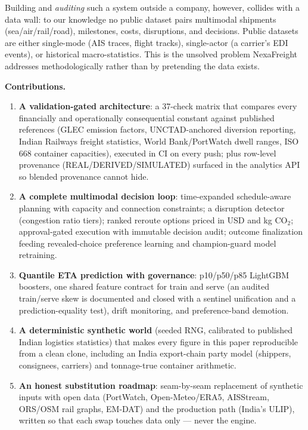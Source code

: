 \documentclass[11pt]{article}
\begin{document}
Building and \emph{auditing} such a system outside a company, however,
collides with a data wall: to our knowledge no public dataset pairs
multimodal shipments (sea/air/rail/road), milestones, costs, disruptions,
and decisions. Public datasets are either single-mode (AIS traces, flight
tracks), single-actor (a carrier's EDI events), or historical
macro-statistics. This is the unsolved problem NexaFreight addresses
methodologically rather than by pretending the data exists.

\textbf{Contributions.}
\begin{enumerate}
\item \textbf{A validation-gated architecture}: a 37-check matrix that
compares every financially and operationally consequential constant
against published references (GLEC emission factors, UNCTAD-anchored
diversion reporting, Indian Railways freight statistics, World
Bank/PortWatch dwell ranges, ISO 668 container capacities), executed in
CI on every push; plus row-level provenance (REAL/DERIVED/SIMULATED)
surfaced in the analytics API so blended provenance cannot hide.
\item \textbf{A complete multimodal decision loop}: time-expanded
schedule-aware planning with capacity and connection constraints; a
disruption detector (congestion ratio tiers); ranked reroute options
priced in USD and kg CO$_2$; approval-gated execution with immutable
decision audit; outcome finalization feeding revealed-choice preference
learning and champion-guard model retraining.
\item \textbf{Quantile ETA prediction with governance}: p10/p50/p85
LightGBM boosters, one shared feature contract for train and serve (an
audited train/serve skew is documented and closed with a sentinel
unification and a prediction-equality test), drift monitoring, and
preference-band demotion.
\item \textbf{A deterministic synthetic world} (seeded RNG, calibrated to
published Indian logistics statistics) that makes every figure in this
paper reproducible from a clean clone, including an India export-chain
party model (shippers, consignees, carriers) and tonnage-true container
arithmetic.
\item \textbf{An honest substitution roadmap}: seam-by-seam replacement
of synthetic inputs with open data (PortWatch, Open-Meteo/ERA5, AISStream,
ORS/OSM rail graphs, EM-DAT) and the production path (India's ULIP),
written so that each swap touches data only --- never the engine.
\end{enumerate}
\end{document}
